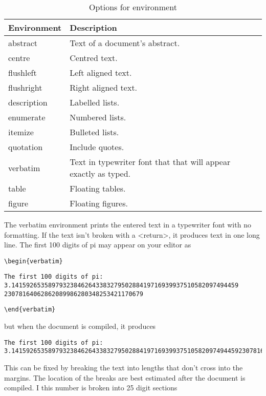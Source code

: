 \documentclass[a4paper]{article}
\begin{document}
\begin{table}
	\small
	\begin{center}
		\begin{tabular}{ll}
			\hline
			Environment & Description\\
			\hline
			abstract    & Text of a document’s abstract. \\
			centre      & Centred text. \\
			flushleft   & Left aligned text. \\
			flushright  & Right aligned text. \\
			description & Labelled lists. \\
			enumerate   & Numbered lists. \\
			itemize     & Bulleted lists. \\
			quotation   & Include quotes. \\
			verbatim    & Text in typewriter font that that will appear exactly as typed. \\
			table       & Floating tables. \\
			figure      & Floating figures. \\
			\hline
		\end{tabular}
		\caption{Options for environment}
	\end{center}
\end{table}


The verbatim environment prints the entered text in a typewriter font with no formatting. If the text isn't broken with a <return>, it produces text in one long line. The first 100 digits of pi may appear on your editor as

\begin{flushleft}
\texttt{\textbackslash begin\{verbatim\}}
\begin{verbatim}
The first 100 digits of pi:
3.14159265358979323846264338327950288419716939937510582097494459
23078164062862089986280348253421170679
\end{verbatim}
\texttt{\textbackslash end\{verbatim\}}
\end{flushleft}

but when the document is compiled, it produces

\begin{verbatim}
The first 100 digits of pi:
3.1415926535897932384626433832795028841971693993751058209749445923078164062862089986280348253421170679
\end{verbatim}

This can be fixed by breaking the text into lengths that don't cross into the margins. The location of the breaks are best estimated after the document is compiled. I this number is broken into 25 digit sections 
\end{document}
